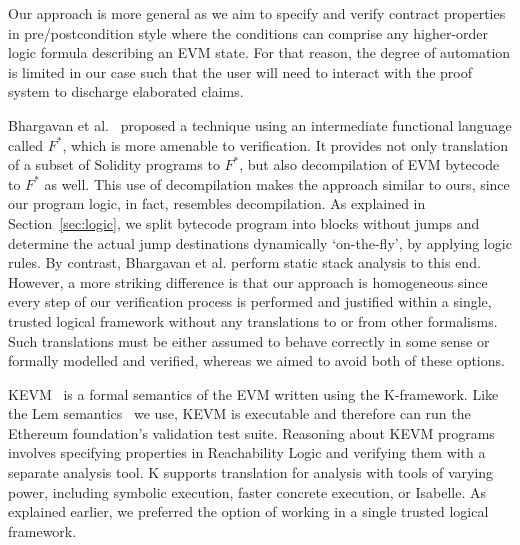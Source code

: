 \documentclass[sigplan,10pt,review]{acmart}\settopmatter{printfolios=true,printccs=false,printacmref=false}
\begin{document}
Our approach is more general as we aim to specify and verify contract properties in pre/postcondition
style where the conditions can comprise any higher-order logic formula describing an EVM state. 
For that reason, the degree of automation is limited in our case such that the user will need to interact 
with the proof system to discharge elaborated claims.

Bhargavan et al.~\cite{Bhargavan:2016:FVS:2993600.2993611} proposed a technique using an
intermediate functional language called $F^*$,
which is more amenable to verification. 
It provides not only translation of a subset of Solidity programs 
to $F^*$, but also decompilation of EVM bytecode to $F^*$ as well.
This use of decompilation makes
the approach similar to ours, since our program logic, in fact, resembles decompilation.
As explained in Section~\ref{sec:logic}, we split bytecode program into blocks without jumps
and determine the actual jump destinations dynamically `on-the-fly', by applying logic rules.
By contrast, Bhargavan et al. perform static stack analysis to this end.
However, a more striking difference is that our approach is homogeneous since every step of our verification process 
is performed and justified within a single, trusted logical framework without any translations to or from other formalisms.
Such translations must be either assumed to behave correctly in some sense or
formally modelled and verified, whereas we aimed to avoid both of these options.

KEVM~\cite{Hildenbrandt_SZRDGR_17} is a formal semantics of the EVM written using the K-framework.
Like the Lem semantics~\cite{Yoichi} we use, KEVM is executable and therefore can run the Ethereum foundation's validation test suite.
Reasoning about KEVM programs involves specifying properties in Reachability Logic and
verifying them with a separate analysis tool.
K supports translation for analysis with tools of varying
power, including symbolic execution, faster concrete execution, or Isabelle.
As explained earlier, we preferred the option of working in a single trusted logical framework.

\end{document}
